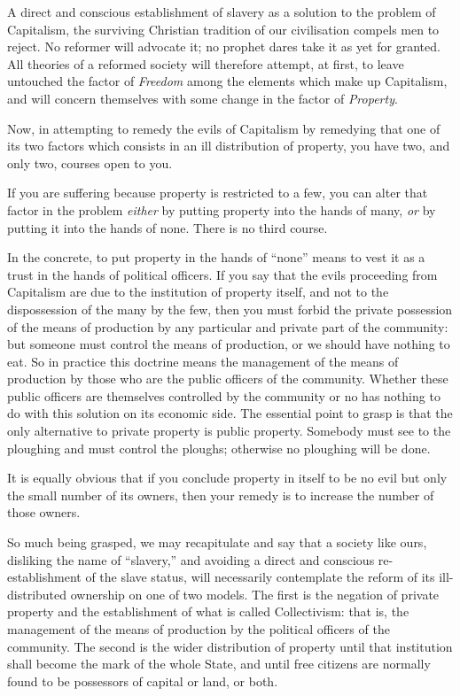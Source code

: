 \documentclass{book}
\begin{document}
A direct and conscious establishment of slavery as a solution to the problem of Capitalism, the surviving Christian tradition of our civilisation compels men to reject. No reformer will advocate it; no prophet dares take it as yet for granted. All theories of a reformed society will therefore attempt, at first, to leave untouched the factor of \emph{Freedom} among the elements which make up Capitalism, and will concern themselves with some change in the factor of \emph{Property}.\footnotemark[1]

Now, in attempting to remedy the evils of Capitalism by remedying that one of its two factors which consists in an ill distribution of property, you have two, and only two, courses open to you.

If you are suffering because property is restricted to a few, you can alter that factor in the problem \emph{either} by putting property into the hands of many, \emph{or} by putting it into the hands of none. There is no third course.

In the concrete, to put property in the hands of “none” means to vest it as a trust in the hands of political officers. If you say that the evils proceeding from Capitalism are due to the institution of property itself, and not to the dispossession of the many by the few, then you must forbid the private possession of the means of production by any particular and private part of the community: but someone must control the means of production, or we should have nothing to eat. So in practice this doctrine means the management of the means of production by those who are the public officers of the community. Whether these public officers are themselves controlled by the community or no has nothing to do with this solution on its economic side. The essential point to grasp is that the only alternative to private property is public property. Somebody must see to the ploughing and must control the ploughs; otherwise no ploughing will be done.

It is equally obvious that if you conclude property in itself to be no evil but only the small number of its owners, then your remedy is to increase the number of those owners.

So much being grasped, we may recapitulate and say that a society like ours, disliking the name of “slavery,” and avoiding a direct and conscious re-establishment of the slave status, will necessarily contemplate the reform of its ill-distributed ownership on one of two models. The first is the negation of private property and the establishment of what is called Collectivism: that is, the management of the means of production by the political officers of the community. The second is the wider distribution of property until that institution shall become the mark of the whole State, and until free citizens are normally found to be possessors of capital or land, or both.
\end{document}
